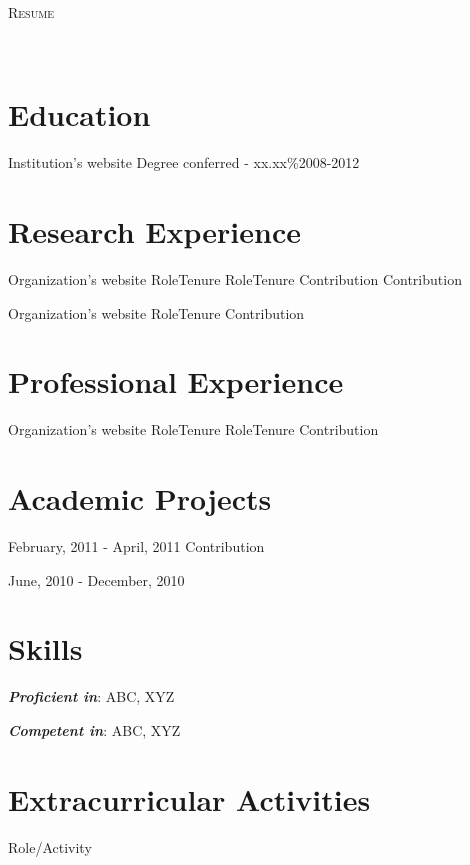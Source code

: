 \documentclass[hidelinks,12pt,oneside,letterpaper]{my_resume}
\begin{document}
\noindent
\begin{center}{\huge \scshape {Resume\\}}\end{center}
\noindent
{\large{  }}
\hfill
{}
\\
\hfill
{}
\section{Education}
{Institution's website}
{Degree conferred - xx.xx\%}{2008-2012}

\section{Research Experience}
{Organization's website}
{Role}{Tenure}
{Role}{Tenure}
{Contribution}
{Contribution}

{Organization's website}
{Role}{Tenure}
{}{}
{Contribution}
{}

\section{Professional Experience}
{Organization's website}
{Role}{Tenure}
{Role}{Tenure}
{Contribution}
{}

\section{Academic Projects}
{February, 2011 - April, 2011}
{Contribution}

{June, 2010 - December, 2010}
{}

\section{Skills}
\noindent%
\vspace{0.0625ex}
\begin{itemize}[noitemsep,topsep=0pt]
    {\item \textbf{\textit{Proficient in}}: ABC, XYZ}
    {\item \textbf{\textit{Competent in}}: ABC, XYZ}
\end{itemize}

\section{Extracurricular Activities}
\noindent
\vspace{0.0625ex}
{Role/Activity}

\end{document}
